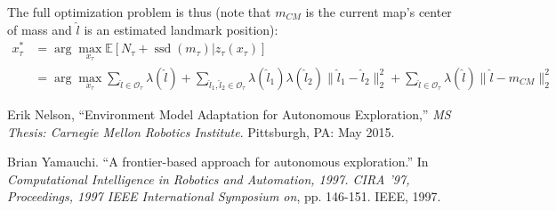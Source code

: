 \documentclass[12pt]{article}
\DeclareMathOperator{\ssd}{ssd}
\begin{document}
The full optimization problem is thus (note that $m_{CM}$ is the current map's center of mass and $\hat l$ is an estimated landmark position):
\begin{align}
  x_{\tau}^*
  &= \arg \max_{x_{\tau}} \mathbb{E}[N_{\tau} + \ssd(m_{\tau}) | z_{\tau}(x_{\tau})]\\
  &= \arg \max_{x_{\tau}} \sum_{\hat l \in \mathcal{O_{\tau}}} \lambda(\hat l) + \sum_{\hat l_1, \hat l_2 \in \mathcal{O}_{\tau}} \lambda(\hat l_1) \lambda(\hat l_2) \|\hat l_1 - \hat l_2\|_2^2 + \sum_{\hat l \in \mathcal{O}_{\tau}} \lambda(\hat l) \|\hat l - m_{CM}\|_2^2
\end{align}


\begin{thebibliography}{99}

 Erik Nelson, ``Environment Model Adaptation for Autonomous Exploration,'' \textit{MS Thesis: Carnegie Mellon Robotics Institute}. Pittsburgh, PA: May 2015.

 Brian Yamauchi. ``A frontier-based approach for autonomous exploration.'' In \textit{Computational Intelligence in Robotics and Automation, 1997. CIRA '97, Proceedings, 1997 IEEE International Symposium on}, pp. 146-151. IEEE, 1997.
  
\end{thebibliography}
\end{document}
